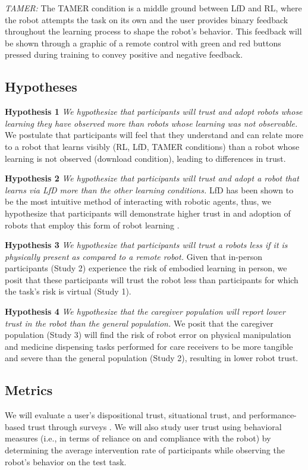 \documentclass[letterpaper]{article} %
\begin{document}
\textit{TAMER: }The TAMER condition is a middle ground between LfD and RL, where the robot attempts the task on its own and the user provides binary feedback throughout the learning process to shape the robot's behavior. This feedback will be shown through a graphic of a remote control with green and red buttons pressed during training to convey positive and negative feedback.

\subsection{Hypotheses}
\label{sec:hypotheses}

\textbf{Hypothesis 1} \textit{We hypothesize that participants will trust and adopt robots whose learning they have observed more than robots whose learning was not observable.} We postulate that participants will feel that they understand and can relate more to a robot that learns visibly (RL, LfD, TAMER conditions) than a robot whose learning is not observed (download condition), leading to differences in trust.

\textbf{Hypothesis 2} \textit{We hypothesize that participants will trust and adopt a robot that learns via LfD more than the other learning conditions.} LfD has been shown to be the most intuitive method of interacting with robotic agents, thus, we hypothesize that participants will demonstrate higher trust in and adoption of robots that employ this form of robot learning \cite{7451754, Akgun2011RobotLF}.

\textbf{Hypothesis 3} \textit{We hypothesize that participants will trust a robots less if it is physically present as compared to a remote robot.} Given that in-person participants (Study 2) experience the risk of embodied learning in person, we posit that these participants will trust the robot less than participants for which the task's risk is virtual (Study 1).

\textbf{Hypothesis 4} \textit{We hypothesize that the caregiver population will report lower trust in the robot than the general population.} We posit that the caregiver population (Study 3) will find the risk of robot error on physical manipulation and medicine dispensing tasks performed for care receivers to be more tangible and severe than the general population (Study 2), resulting in lower robot trust.

\subsection{Metrics}
\label{sec:metrics}
We will evaluate a user's dispositional trust, situational trust, and performance-based trust through surveys \cite{merritt_i_2013, jian_foundations_2000, malle_multidimensional_2021}. We will also study user trust using behavioral measures (i.e., in terms of reliance on and compliance with the robot) by determining the average intervention rate of participants while observing the robot's behavior on the test task.
\end{document}
